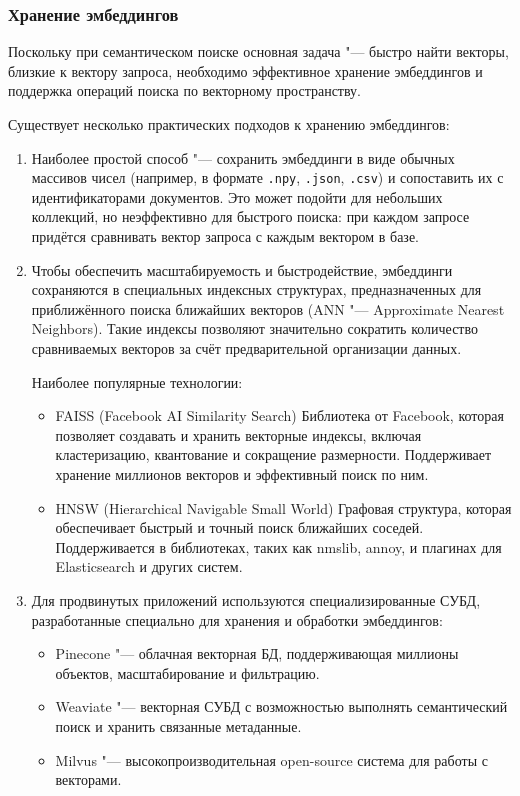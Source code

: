 \documentclass[coursework]{SCWorks}
\begin{document}
\subsubsection{Хранение эмбеддингов}
Поскольку при семантическом поиске основная задача "--- быстро найти векторы, близкие к вектору запроса, необходимо эффективное хранение эмбеддингов и поддержка операций поиска по векторному пространству.

Существует несколько практических подходов к хранению эмбеддингов:
\begin{enumerate}
    \item
Наиболее простой способ "--- сохранить эмбеддинги в виде обычных массивов чисел (например, в формате \verb|.npy|, \verb|.json|, \verb|.csv|) и сопоставить их с идентификаторами документов. Это может подойти для небольших коллекций, но неэффективно для быстрого поиска: при каждом запросе придётся сравнивать вектор запроса с каждым вектором в базе.

    \item Чтобы обеспечить масштабируемость и быстродействие, эмбеддинги сохраняются в специальных индексных структурах, предназначенных для приближённого поиска ближайших векторов (ANN "--- Approximate Nearest Neighbors). Такие индексы позволяют значительно сократить количество сравниваемых векторов за счёт предварительной организации данных.

Наиболее популярные технологии:
\begin{itemize}
    \item 
    FAISS (Facebook AI Similarity Search)
    Библиотека от Facebook, которая позволяет создавать и хранить векторные индексы, включая кластеризацию, квантование и сокращение размерности. Поддерживает хранение миллионов векторов и эффективный поиск по ним.

    \item HNSW (Hierarchical Navigable Small World)
    Графовая структура, которая обеспечивает быстрый и точный поиск ближайших соседей. Поддерживается в библиотеках, таких как nmslib, annoy, и плагинах для Elasticsearch и других систем.
\end{itemize}

    \item Для продвинутых приложений используются специализированные СУБД, разработанные специально для хранения и обработки эмбеддингов:
    \begin{itemize}
        \item 
        Pinecone "--- облачная векторная БД, поддерживающая миллионы объектов, масштабирование и фильтрацию.

        \item Weaviate "--- векторная СУБД с возможностью выполнять семантический поиск и хранить связанные метаданные.

        \item Milvus "--- высокопроизводительная open-source система для работы с векторами.
        \end{itemize}
\end{enumerate}
\end{document}
